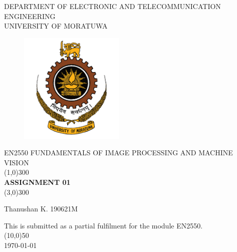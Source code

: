 \documentclass[11pt]{article}
\begin{document}
\begin{titlepage}
    
\begin{center}
    \vspace*{0cm}
    \textsc{\Large DEPARTMENT OF ELECTRONIC AND TELECOMMUNICATION ENGINEERING\\
    [2mm]
    UNIVERSITY OF MORATUWA}\\
    [0.75cm]
    \begin{figure}[htp]
    \centering
    \includegraphics[width=5cm]{UoMLOGO.png}
    \label{fig:galaxy}
    \end{figure}

    \textsc{\Large EN2550 FUNDAMENTALS OF IMAGE PROCESSING AND MACHINE VISION}\\
    [5mm]
    \line(1,0){300}\\
    [1mm]
    \huge{\bfseries  ASSIGNMENT 01} \\
    \line(3,0){300}\\
[1.2cm]  
\end{center}
\begin{center}
    Thanushan K.
    \hspace*{1cm}
    190621M
\end{center}
\vspace*{1cm}
\begin{center}
    This is submitted as a partial fulfilment for the module EN2550.\\
    \line(10,0){50}\\
    [0.5cm]
    \today
    \end{center}
\end{titlepage}
\end{document}
